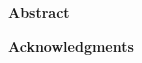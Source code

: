 \documentclass[main.tex]{subfiles}
\begin{document}
\vspace{3cm}
\begin{center}
    \bfseries\Large Abstract
\end{center}

\vspace{3cm}

\begin{center}
    \bfseries\Large Acknowledgments
\end{center}
\end{document}
